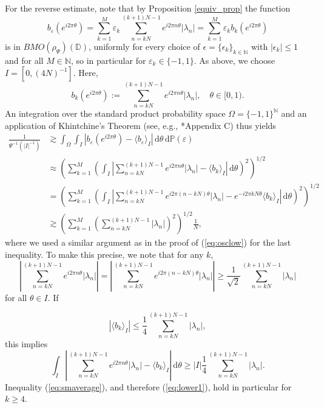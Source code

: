 \documentclass[a4paper, leqno, 10pt]{amsart}
\numberwithin{equation}{section}
\newcommand{\dd}{\mathrm{d}}
\newcommand{\D}{\mathbb{D}}
\newcommand{\N}{\mathbb{N}}
\newcommand{\eps}{\varepsilon}
\begin{document}
For the reverse estimate, note that by Proposition \ref{equiv_prop}
the function
\[
b_\eps( e^{i 2 \pi \theta} ) = \sum_{k=1}^M \eps_k \sum_{n= k N}^{(k+1)N -1}  e^{i 2 \pi n \theta} |\lambda_n|
= \sum_{k=1}^M \eps_k b_k( e^{i 2 \pi  \theta} ) 
\]
is in $BMO (\rho_{\Psi}) (\D)$, uniformly 
for every choice of $\epsilon = \{ \epsilon_k \}_{k \in \N}$ with $| \epsilon_k | \leq 1$ and for all $M \in \N$, so in particular for $\eps_k \in \{-1,1\}$.
As above, we choose $I= [0, (4N)^{-1}]$. Here, 
\[
b_k (e^{i 2 \pi \theta}) := \sum_{n= k N}^{(k+1)N -1}  e^{i 2 \pi n \theta} |\lambda_n|, \quad \theta \in [0,1).
\]
An integration over the standard product probability space 
$\Omega = \{-1,1\}^\N$ and an application of Khintchine's Theorem (see, e.g., \cite{Grafakos_modern}*{Appendix C}) thus yields
\begin{align*}
\frac{1}{ \Psi^{-1}(|I|^{-1})} & \gtrsim \int_\Omega \int_I \left|  b_\eps(e^{i 2 \pi \theta}) - \langle b_\eps \rangle_I \right| \, \dd \theta \, \dd \mathbb{P} (\eps) \\
& \approx \left( \sum_{k=1}^M \left( \int_I \left|\sum_{n= k N}^{(k+1)N -1}  e^{i 2 \pi n \theta} |\lambda_n| - \langle b_k \rangle_I \right| \, \dd \theta \right)^2\right)^{1/2} \\
& = \left( \sum_{k=1}^M \left( \int_I \left|\sum_{n= k N}^{(k+1)N -1}  e^{i 2 \pi (n- kN)\theta} |\lambda_n|  -  e^{- i 2 \pi k N \theta}\langle b_k \rangle_I \right| \, \dd \theta \right)^2\right)^{1/2} \\
& \gtrsim  \left( \sum_{k=1}^M \left( \sum_{n= k N}^{(k+1)N -1}   |\lambda_n|   \right)^2\right)^{1/2} \frac{1}{N},
\end{align*}
where we used a similar argument as in the proof of (\ref{eq:osclow}) for the last 
inequality. To make this precise, we note that for any $k$,
\[
\left|\sum_{n= k N}^{(k+1)N -1}  e^{i 2 \pi n \theta} |\lambda_n| \right| =  \left|\sum_{n= k N}^{(k+1)N -1}  e^{i 2 \pi (n- kN)\theta} |\lambda_n| \right| \geq \frac{1}{\sqrt{2}} \sum_{n= k N}^{(k+1)N -1} |\lambda_n|
\]
for all $\theta \in I$. If 

\begin{equation}\label{eq:smaverage}
|\langle b_k \rangle_I| \leq \frac{1}{4} \sum_{n= k N}^{(k+1)N -1}   |\lambda_n|,
\end{equation}
this implies
\begin{equation}  \label{eq:lower1}
\int_I \left|\sum_{n= k N}^{(k+1)N -1}  e^{i 2 \pi n \theta} |\lambda_n|  - \langle b_k \rangle_I \right| \, \dd \theta \geq |I| \frac{1}{4} \sum_{n= k N}^{(k+1)N -1} |\lambda_n|.
\end{equation}
Inequality (\ref{eq:smaverage}), and therefore (\ref{eq:lower1}), hold in particular for $k \geq 4$.
\end{document}
